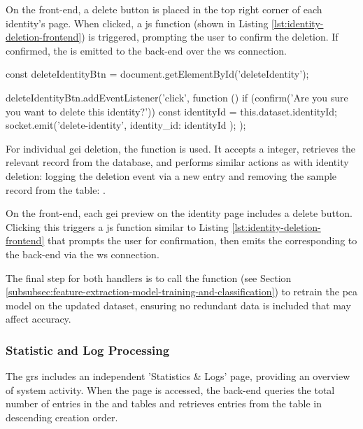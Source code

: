 On the front-end, a delete button is placed in the top right corner of each identity's page.
When clicked, a \ac{js} function (shown in Listing \ref{lst:identity-deletion-frontend}) is triggered, prompting the user to confirm the deletion.
If confirmed, the  is emitted to the back-end over the \ac{ws} connection.

\begin{code}[minted language=javascript]
	const deleteIdentityBtn = document.getElementById('deleteIdentity');

	deleteIdentityBtn.addEventListener('click', function () {
		if (confirm('Are you sure you want to delete this identity?')) {
			const identityId = this.dataset.identityId;
			socket.emit('delete-identity', { identity_id: identityId });
		}
	});
\end{code}
\label{lst:identity-deletion-frontend} \vspace{10pt}

For individual \ac{gei} deletion, the  function is used. 
It accepts a  integer, retrieves the relevant  record from the database, and performs similar actions as with identity deletion: logging the deletion event via a new  entry and removing the sample record from the  table: .

On the front-end, each \ac{gei} preview on the identity page includes a delete button.
Clicking this triggers a \ac{js} function similar to Listing \ref{lst:identity-deletion-frontend} that prompts the user for confirmation, then emits the corresponding  to the back-end via the \ac{ws} connection.

The final step for both handlers is to call the  function (see Section \ref{subsubsec:feature-extraction-model-training-and-classification}) to retrain the \ac{pca} model on the updated dataset, ensuring no redundant data is included that may affect accuracy.


\subsubsection{Statistic and Log Processing}
\label{subsubsec:statistic-and-log-processing}

The \ac{grs} includes an independent 'Statistics \& Logs' page, providing an overview of system activity.
When the page is accessed, the back-end queries the total number of entries in the  and  tables and retrieves entries from the  table in descending creation order.

